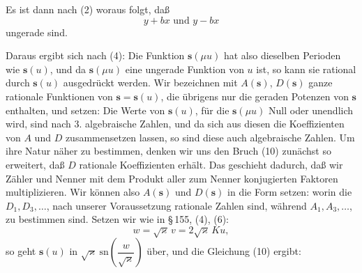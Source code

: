 
Es ist dann nach (2)
woraus folgt, da\ss{}
\[
y + bx \text{ und } y - bx
\]
ungerade sind.

Daraus ergibt sich nach (4):
Die Funktion $\boldsymbol{s}(\mu u)$ hat also dieselben Perioden wie $\boldsymbol{s}(u)$,
und da $\boldsymbol{s}(\mu u)$ eine ungerade Funktion von $u$ ist, so kann sie rational durch $\boldsymbol{s}(u)$ ausgedrückt werden. Wir bezeichnen mit $A(\boldsymbol{s})$, $D(\boldsymbol{s})$ ganze rationale Funktionen von $\boldsymbol{s} = \boldsymbol{s}(u)$, die übrigens nur die geraden Potenzen von $\boldsymbol{s}$ enthalten, und setzen:
Die Werte von $\boldsymbol{s}(u)$, für die $\boldsymbol{s}(\mu u)$ Null oder unendlich wird, sind nach 3. algebraische Zahlen, und da sich aus diesen die Koeffizienten von $A$ und $D$ zusammensetzen lassen, so sind diese auch algebraische Zahlen. Um ihre Natur näher zu bestimmen, denken wir uns den Bruch (10) zunächst so erweitert, da\ss{} $D$ rationale Koeffizienten erhält. Das geschieht dadurch, da\ss{} wir Zähler und Nenner mit dem Produkt aller zum Nenner konjugierten Faktoren multiplizieren. Wir können also $A(\boldsymbol{s})$ und $D(\boldsymbol{s})$ in die Form setzen:
worin die $D_1, D_3, \dots$, nach unserer Voraussetzung rationale Zahlen sind, während $A_1, A_3, \dots$, zu bestimmen sind. Setzen wir wie in \S\,155, (4), (6):
\[
w = \sqrt{\varkappa}\,v = 2\sqrt{\varkappa}\,Ku,
\]
so geht $\boldsymbol{s}(u)$ in $\sqrt{\varkappa}\ \mathrm{sn}\left(\dfrac{w}{\sqrt{\varkappa}}\right)$ über, und die Gleichung (10) ergibt:

